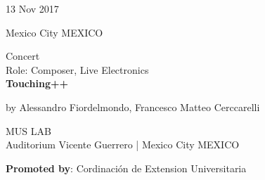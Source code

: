 \documentclass[7pt,a4paper]{article}
\begin{document}
\begin{mdframed}[
    backgroundcolor=white,
    linecolor=white,
    linewidth=0pt,
    innerleftmargin=6pt,
    innerrightmargin=6pt,
    innertopmargin=6pt,
    innerbottommargin=6pt,
    skipabove=0pt,
    skipbelow=0pt
]

\begin{minipage}[t]{0.28\textwidth}

13 Nov 2017

\scriptsize Mexico City MEXICO


\end{minipage}
\begin{minipage}[t]{0.68\textwidth}
\small Concert
\\\scriptsize Role: Composer, Live Electronics
\\ \normalsize \textbf{Touching++}
\par\scriptsize by Alessandro Fiordelmondo, Francesco Matteo Cerccarelli

\vspace{0.25cm}



\small MUS LAB\\Auditorium Vicente Guerrero | \scriptsize Mexico City MEXICO

\vspace{0.1cm}
\scriptsize

\vspace{0.1cm}
\par \textbf{Promoted by}: Cordinación de Extension Universitaria
\end{minipage}
\vspace{0.25cm}
\end{mdframed}
\end{document}
